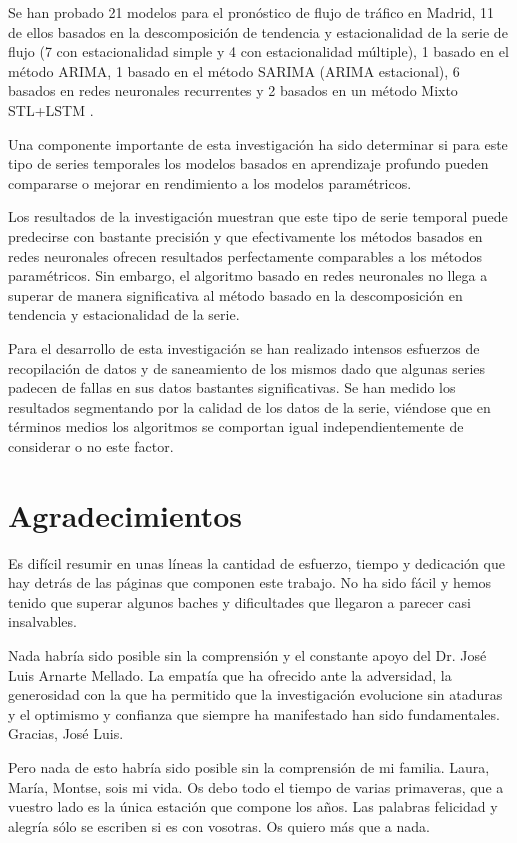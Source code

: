 Se han probado 21 modelos para el pronóstico de flujo de tráfico en Madrid, 11 de ellos basados en la descomposición de tendencia y estacionalidad de la serie de flujo (7 con estacionalidad simple y 4 con estacionalidad múltiple), 1 basado en el método ARIMA, 1 basado en el método SARIMA (ARIMA estacional), 6 basados en redes neuronales recurrentes y 2 basados en un método Mixto STL+LSTM .

Una componente importante de esta investigación ha sido determinar si para este tipo de series temporales los modelos basados en aprendizaje profundo pueden compararse o mejorar en rendimiento a los modelos paramétricos.

Los resultados de la investigación muestran que este tipo de serie temporal puede predecirse con bastante precisión y que efectivamente los métodos basados en redes neuronales ofrecen resultados perfectamente comparables a los métodos paramétricos. Sin embargo, el algoritmo basado en redes neuronales no llega a superar de manera significativa al método basado en la descomposición en tendencia y estacionalidad de la serie.

Para el desarrollo de esta investigación se han realizado intensos esfuerzos de recopilación de datos y de saneamiento de los mismos dado que algunas series padecen de fallas en sus datos bastantes significativas. Se han medido los resultados segmentando por la calidad de los datos de la serie, viéndose que en términos medios los algoritmos se comportan igual independientemente de considerar o no este factor.


\chapter*{Agradecimientos}


Es difícil resumir en unas líneas la cantidad de esfuerzo, tiempo y dedicación que hay detrás de las páginas que componen este trabajo. No ha sido fácil y hemos tenido que superar algunos baches y dificultades que llegaron a parecer casi insalvables.

Nada habría sido posible sin la comprensión y el constante apoyo del Dr. José Luis Arnarte Mellado. La empatía que ha ofrecido ante la adversidad, la generosidad con la que ha permitido que la investigación evolucione sin ataduras y el optimismo y confianza que siempre ha manifestado han sido fundamentales. Gracias, José Luis.

Pero nada de esto habría sido posible sin la comprensión de mi familia. Laura, María, Montse, sois mi vida. Os debo todo el tiempo de varias primaveras, que a vuestro lado es la única estación que compone los años. Las palabras felicidad y alegría sólo se escriben si es con vosotras. Os quiero más que a nada.


\mainmatter
